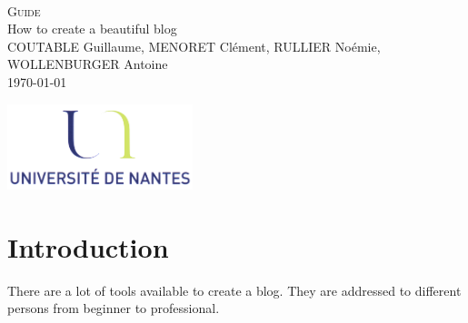 \documentclass[a4paper,10pt]{article}
\begin{document}
\fancyhead[LE,CE,RE,LO,CO,RO]{}
\fancyfoot[LE,CE,RE,LO,CO,RO]{}
\renewcommand{\headrulewidth}{0.4pt}
\renewcommand{\footrulewidth}{0.4pt}

\begin{titlepage}

\vspace*{\fill}~
\begin{center}
{\large \textsc{Guide}} \\
\vspace{1cm}
{\LARGE How to create a beautiful blog} \\
\vspace{1cm}
COUTABLE Guillaume, MENORET Clément, RULLIER Noémie, WOLLENBURGER Antoine \\
\today
\end{center}
\vspace*{\fill}

\begin{center}
\noindent 
\includegraphics[height=2.5cm]{Images/universite.png}
\end{center}
\pagebreak
\end{titlepage}

\newpage
\tableofcontents 

\newpage
\pagestyle{fancy}

\section{Introduction}

There are a lot of tools available to create a blog. They are addressed to different persons from beginner to professional.
\end{document}
